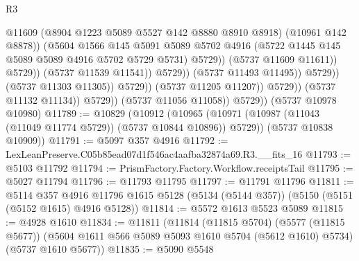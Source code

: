 \begin{lexlean}{R3}
\begin{coremodule}
                                                  @11609
                                                  (@8904 @1223 @5089 @5527 @142 @8880 @8910 @8918)
                                                  (@10961 @142 @8878))
                                                (@5604
                                                  @1566
                                                  @145
                                                  @5091
                                                  @5089
                                                  @5702
                                                  @4916
                                                  (@5722
                                                    @1445
                                                    @145
                                                    @5089
                                                    @5089
                                                    @4916
                                                    @5702
                                                    @5729
                                                    @5731)
                                                  @5729))
                                              (@5737 @11609 @11611))
                                            @5729))
                                        (@5737 @11539 @11541))
                                      @5729))
                                  (@5737 @11493 @11495))
                                @5729))
                            (@5737 @11303 @11305))
                          @5729))
                      (@5737 @11205 @11207))
                    @5729))
                (@5737 @11132 @11134))
              @5729))
          (@5737 @11056 @11058))
        @5729))
    (@5737 @10978 @10980)
@11789 := @10829
    (@10912
      (@10965 (@10971 (@10987 (@11043 (@11049 @11774 @5729)) (@5737 @10844 @10896)) @5729))
      (@5737 @10838 @10909))
@11791 := @5097 @357 @4916
@11792 := LexLeanPreserve.C05b85ead07d1f546ac4aafba32874a69.R3.__fits_16
@11793 := @5103 @11792
@11794 := PrismFactory.Factory.Workflow.receiptsTail
@11795 := @5027 @11794
@11796 := @11793 @11795
@11797 := @11791 @11796
@11811 := @5114
    @357
    @4916
    @11796
    @1615
    @5128
    (@5134 (@5144 @357))
    (@5150 (@5151 (@5152 @1615) @4916 @5128))
@11814 := @5572 @1613 @5523 @5089
@11815 := @4928 @1610
@11834 := @11811
    (@11814
      (@11815 @5704)
      (@5577 (@11815 @5677))
      (@5604 @1611 @566 @5089 @5093 @1610 @5704 (@5612 @1610) @5734)
      (@5737 @1610 @5677))
@11835 := @5090 @5548

\end{coremodule}
\end{lexlean}
